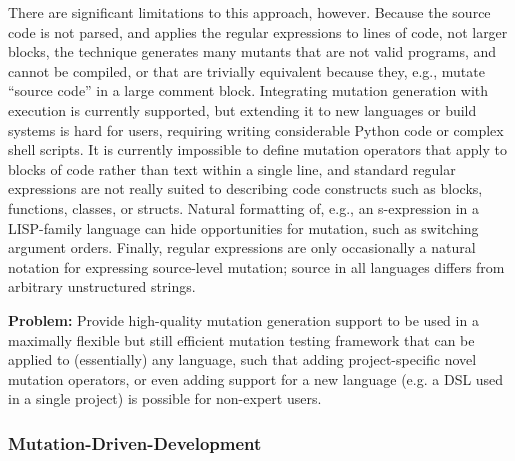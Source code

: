 There are significant limitations to this approach, however.  Because the source code is not parsed, and applies the regular expressions to lines of code, not larger blocks, the technique generates many mutants that are not valid programs, and cannot be compiled, or that are trivially equivalent because they, e.g., mutate ``source code'' in a large comment block.  Integrating mutation generation with execution is currently supported, but extending it to new languages or build systems is hard for users, requiring writing considerable Python code or complex shell scripts.  It is currently impossible to define mutation operators that apply to blocks of code rather than text within a single line, and standard regular expressions are not really suited to describing code constructs such as blocks, functions, classes, or structs.  Natural formatting of, e.g., an s-expression in a LISP-family language can hide opportunities for mutation, such as switching argument orders.  Finally, regular expressions are only occasionally a natural notation for expressing source-level mutation; source in all languages differs from arbitrary unstructured strings.

\begin{framed}
{\bf Problem:}  Provide high-quality mutation generation support to be used in a maximally flexible but still efficient mutation testing framework that can be applied to (essentially) any language, such that adding project-specific novel mutation operators, or even adding support for a new language (e.g. a DSL used in a single project) is possible for non-expert users.
\end{framed}

\subsubsection{Mutation-Driven-Development}

